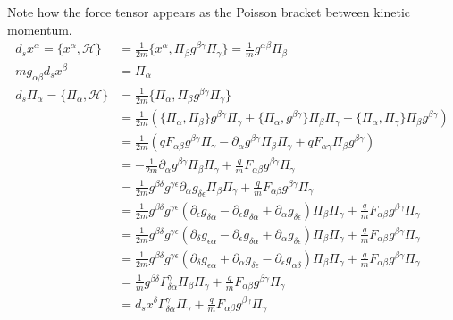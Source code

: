\documentclass[11pt]{article}
\begin{document}
Note how the force tensor appears as the Poisson bracket between kinetic momentum.
\begin{equation}
\begin{aligned}
d_s x^\alpha = \{x^\alpha, \mathcal{H}\} &= \frac{1}{2m} \{x^\alpha, \Pi_\beta g^{\beta\gamma} \Pi_\gamma\} = \frac{1}{m} g^{\alpha \beta} \Pi_\beta \\
m g_{\alpha\beta} d_s x^\beta &= \Pi_\alpha \\
d_s \Pi_\alpha = \{ \Pi_\alpha , \mathcal{H} \} &= \frac{1}{2m} \{\Pi_\alpha, \Pi_\beta g^{\beta\gamma} \Pi_\gamma\} \\
&= \frac{1}{2m} \left( \{\Pi_\alpha, \Pi_\beta\}  g^{\beta\gamma} \Pi_\gamma + \{\Pi_\alpha,  g^{\beta\gamma} \} \Pi_\beta \Pi_\gamma + \{\Pi_\alpha,  \Pi_\gamma\} \Pi_\beta g^{\beta\gamma} \right)  \\
&= \frac{1}{2m} \left( q F_{\alpha \beta}  g^{\beta\gamma} \Pi_\gamma - \partial_\alpha g^{\beta\gamma} \Pi_\beta \Pi_\gamma + q F_{\alpha \gamma} \Pi_\beta g^{\beta\gamma} \right)  \\
&= - \frac{1}{2m} \partial_\alpha g^{\beta\gamma} \Pi_\beta \Pi_\gamma + \frac{q}{m} F_{\alpha\beta} g^{\beta\gamma} \Pi_\gamma \\
&= \frac{1}{2m} g^{\beta\delta} g^{\gamma\epsilon} \partial_\alpha g_{\delta\epsilon} \Pi_\beta \Pi_\gamma + \frac{q}{m} F_{\alpha\beta} g^{\beta\gamma} \Pi_\gamma \\
&= \frac{1}{2m} g^{\beta\delta} g^{\gamma\epsilon}(\partial_\epsilon g_{\delta\alpha} - \partial_\epsilon g_{\delta\alpha} + \partial_\alpha g_{\delta\epsilon} ) \Pi_\beta \Pi_\gamma + \frac{q}{m} F_{\alpha\beta} g^{\beta\gamma} \Pi_\gamma \\
&= \frac{1}{2m} g^{\beta\delta} g^{\gamma\epsilon}(\partial_\delta g_{\epsilon\alpha} - \partial_\epsilon g_{\delta\alpha} + \partial_\alpha g_{\delta\epsilon} ) \Pi_\beta \Pi_\gamma + \frac{q}{m} F_{\alpha\beta} g^{\beta\gamma} \Pi_\gamma \\
&= \frac{1}{2m} g^{\beta\delta} g^{\gamma\epsilon}(\partial_\delta g_{\epsilon\alpha} + \partial_\alpha g_{\delta\epsilon} - \partial_\epsilon g_{\alpha\delta}  ) \Pi_\beta \Pi_\gamma + \frac{q}{m} F_{\alpha\beta} g^{\beta\gamma} \Pi_\gamma \\
&= \frac{1}{m} g^{\beta\delta} \Gamma^\gamma_{\delta\alpha} \Pi_\beta \Pi_\gamma + \frac{q}{m} F_{\alpha\beta} g^{\beta\gamma} \Pi_\gamma \\
&= d_sx^\delta \Gamma^\gamma_{\delta\alpha} \Pi_\gamma + \frac{q}{m} F_{\alpha\beta} g^{\beta\gamma} \Pi_\gamma \\

\end{aligned}
\end{equation}
\end{document}
